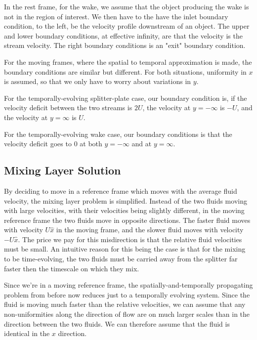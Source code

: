 \documentclass{article}
\begin{document}
In the rest frame, for the wake, we assume that the object producing the
	wake is not in the region of interest.
We then have to the have the inlet boundary condition, to the left,
	be the velocity profile downstream of an object.
The upper and lower boundary conditions, at effective infinity, 
	are that the velocity is the stream velocity.
The right boundary conditions is an "exit" boundary condition.

For the moving frames, where the spatial to temporal approximation is made,
	the boundary conditions are similar but different.
For both situations, uniformity in $x$ is assumed, so that we only
	have to worry about variations in $y$.

For the temporally-evolving splitter-plate case, our boundary condition
	is, if the velocity deficit between the two streams is $2 U$,
	the velocity at $y=-\infty$ is $-U$, and the velocity at
	$y = \infty$ is $U$.

For the temporally-evolving wake case, our boundary conditions is that
	the velocity deficit goes to $0$ at both $y = -\infty$ and 
	at $y=\infty$.

\subsection{Mixing Layer Solution}

By deciding to move in a reference frame which moves with the average fluid
	velocity, the mixing layer problem is simplified.
Instead of the two fluids moving with large velocities, with their velocities
	being slightly different, in the moving reference frame the two fluids 
	move in opposite directions.
The faster fluid moves with velocity $U\hat{x}$ in the moving
	frame, and the slower fluid moves with velocity $-U\hat{x}$.
The price we pay for this misdirection is that the relative fluid velocities
	must be small.
An intuitive reason for this being the case is that for the mixing
	to be time-evolving, the two fluids must be carried away from the
	splitter far faster then the timescale on which they mix.

Since we're in a moving reference frame, the spatially-and-temporally
	propagating problem from before now reduces just to a temporally
	evolving system.
Since the fluid is moving much faster than the relative velocities,
	we can assume that any non-uniformities along the direction
	of flow are on much larger scales than in the direction
	between the two fluids.
We can therefore assume that the fluid is identical in the $x$ 
	direction.
\end{document}
